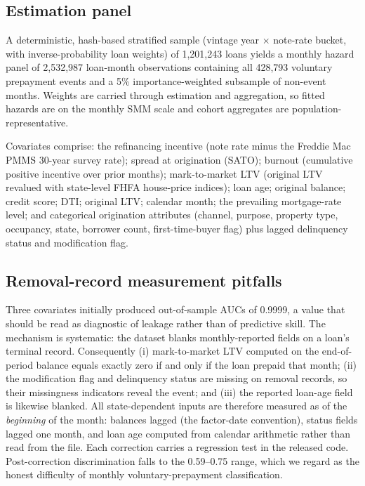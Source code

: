 \documentclass[11pt]{article}
\begin{document}
\subsection{Estimation panel}

A deterministic, hash-based stratified sample (vintage year $\times$ note-rate bucket, with
inverse-probability loan weights) of 1,201,243 loans yields a monthly hazard panel of 2,532,987
loan-month observations containing all 428,793 voluntary prepayment events and a 5\%
importance-weighted subsample of non-event months. Weights are carried through estimation and
aggregation, so fitted hazards are on the monthly SMM scale and cohort aggregates are
population-representative.

Covariates comprise: the refinancing incentive (note rate minus the Freddie Mac PMMS 30-year
survey rate); spread at origination (SATO); burnout (cumulative positive incentive over prior
months); mark-to-market LTV (original LTV revalued with state-level FHFA house-price indices);
loan age; original balance; credit score; DTI; original LTV; calendar month; the prevailing
mortgage-rate level; and categorical origination attributes (channel, purpose, property type,
occupancy, state, borrower count, first-time-buyer flag) plus lagged delinquency status and
modification flag.

\subsection{Removal-record measurement pitfalls}
\label{sec:leakage}

Three covariates initially produced out-of-sample AUCs of 0.9999, a value that should be read as
diagnostic of leakage rather than of predictive skill. The mechanism is systematic: the dataset
blanks monthly-reported fields on a loan's terminal record. Consequently (i) mark-to-market LTV
computed on the end-of-period balance equals exactly zero if and only if the loan prepaid that
month; (ii) the modification flag and delinquency status are missing on removal records, so their
missingness indicators reveal the event; and (iii) the reported loan-age field is likewise
blanked. All state-dependent inputs are therefore measured as of the \emph{beginning} of the
month: balances lagged (the factor-date convention), status fields lagged one month, and loan age
computed from calendar arithmetic rather than read from the file. Each correction carries a
regression test in the released code. Post-correction discrimination falls to the 0.59--0.75
range, which we regard as the honest difficulty of monthly voluntary-prepayment classification.
\end{document}
